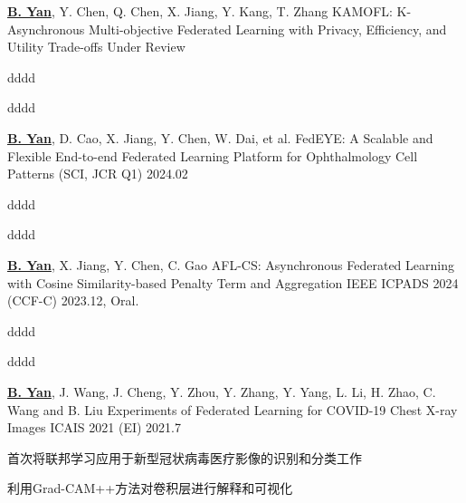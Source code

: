 

\begin{cventries}
\cventry
{\underline{\textbf{B. Yan}}, Y. Chen, Q. Chen, X. Jiang, Y. Kang, T. Zhang} %
{KAMOFL: K-Asynchronous Multi-objective Federated Learning with Privacy, Efficiency, and Utility Trade-offs} %
{Under Review} %
{} %
{
    \begin{cvitems} %
        \item {dddd}
        \item {dddd}
    \end{cvitems}
}

\cventry
{\underline{\textbf{B. Yan}}, D. Cao, X. Jiang, Y. Chen, W. Dai, et al.} %
{FedEYE: A Scalable and Flexible End-to-end Federated Learning Platform for Ophthalmology} %
{Cell Patterns (SCI, JCR Q1)} %
{2024.02} %
{
    \begin{cvitems} %
        \item {dddd}
        \item {dddd}
    \end{cvitems}
}

\cventry
{\underline{\textbf{B. Yan}}, X. Jiang, Y. Chen, C. Gao} %
{AFL-CS: Asynchronous Federated Learning with Cosine Similarity-based Penalty Term and Aggregation} %
{IEEE ICPADS 2024 (CCF-C)} %
{2023.12, Oral.} %
{
    \begin{cvitems} %
        \item {dddd}
        \item {dddd}
    \end{cvitems}
}

\cventry
{\underline{\textbf{B. Yan}}, J. Wang, J. Cheng, Y. Zhou, Y. Zhang, Y. Yang, L. Li, H. Zhao, C. Wang and B. Liu} %
{Experiments of Federated Learning for COVID-19 Chest X-ray Images} %
{ICAIS 2021 (EI)} %
{2021.7} %
{
    \begin{cvitems} %
        \item {首次将联邦学习应用于新型冠状病毒医疗影像的识别和分类工作}
        \item {利用Grad-CAM++方法对卷积层进行解释和可视化}
    \end{cvitems}
}


\end{cventries}
